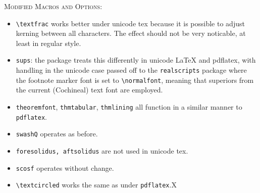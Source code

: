 \documentclass[11pt]{article}
\begin{document}
\textsc{Modified Macros and Options:}
\begin{itemize}
\item
\verb|\textfrac| works better under unicode tex because it is possible to adjust kerning between all characters. The effect should not be very noticable, at least in regular style.
\item {\tt sups}:  the package treats this differently in unicode LaTeX and pdflatex, with handling in the unicode case passed off to the {\tt realscripts} package where the footnote marker font is set to \verb|\normalfont|, meaning that superiors from the current (Cochineal) text font are employed.
\item {\tt theoremfont}, {\tt thmtabular}, {\tt thmlining} all function in a similar manner to {\tt pdflatex}.
\item {\tt swashQ} operates as before.
\item {\tt foresolidus, aftsolidus} are not used in unicode tex.
\item {\tt scosf} operates without change.

\item \verb|\textcircled| works the same as under {\tt pdflatex}.\textcircled{X}
\end{itemize}
\end{document}
